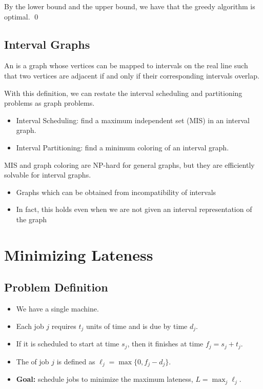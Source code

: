 By the lower bound and the upper bound, we have that the greedy algorithm is optimal. \qed

\subsection{Interval Graphs}

\begin{definition}
    An  is a graph whose vertices can be mapped to intervals on the real line such that two vertices are adjacent if and only if their corresponding intervals overlap.
\end{definition}

With this definition, we can restate the interval scheduling and partitioning problems as graph problems.
\begin{itemize}
    \item Interval Scheduling: find a maximum independent set (MIS) in an interval graph.
    \item Interval Partitioning: find a minimum coloring of an interval graph.
\end{itemize}

MIS and graph coloring are NP-hard for general graphs, but they are efficiently solvable for interval graphs.
\begin{itemize}
    \item Graphs which can be obtained from incompatibility of intervals
    \item In fact, this holds even when we are not given an interval representation of the graph
\end{itemize}

\section{Minimizing Lateness}

\subsection{Problem Definition}

\begin{itemize}
    \item We have a single machine.
    \item Each job $j$ requires $t_j$ units of time and is due by time $d_j$.
    \item If it is scheduled to start at time $s_j$, then it finishes at time $f_j = s_j + t_j$.
    \item The  of job $j$ is defined as $\ell_j = \max\{0, f_j - d_j\}$.
    \item \textbf{Goal:} schedule jobs to minimize the maximum lateness, $L = \max_j \ell_j$.
\end{itemize}

